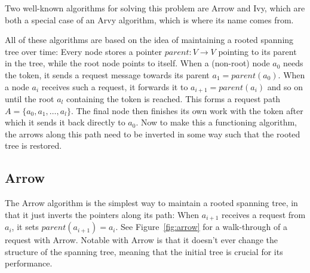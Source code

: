 \documentclass[a4paper, oneside]{discothesis}
\begin{document}
Two well-known algorithms for solving this problem are Arrow and Ivy, which are both a special case of an Arvy algorithm, which is where its name comes from.

All of these algorithms are based on the idea of maintaining a rooted spanning tree over time: Every node stores a pointer $parent : V \rightarrow V$ pointing to its parent in the tree, while the root node points to itself. When a (non-root) node $a_{0}$ needs the token, it sends a request message towards its parent $a_{1}=parent(a_{0})$. When a node $a_{i}$ receives such a request, it forwards it to $a_{i+1}=parent(a_{i})$ and so on until the root $a_{l}$ containing the token is reached. This forms a request path $A=\{a_{0},a_{1},\dots,a_{l}\}$. The final node then finishes its own work with the token after which it sends it back directly to $a_{0}$. Now to make this a functioning algorithm, the arrows along this path need to be inverted in some way such that the rooted tree is restored.


\subsection{Arrow}
\label{intro:arrow}

The Arrow algorithm is the simplest way to maintain a rooted spanning tree, in that it just inverts the pointers along its path: When $a_{i+1}$ receives a request from $a_{i}$, it sets $parent(a_{i+1})=a_{i}$. See Figure~\ref{fig:arrow} for a walk-through of a request with Arrow. Notable with Arrow is that it doesn't ever change the structure of the spanning tree, meaning that the initial tree is crucial for its performance.
\end{document}
